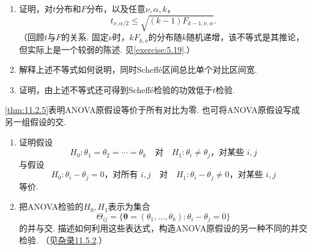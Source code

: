 \begin{exercise}\label{exercise:11.15}\leavevmode
\begin{enumerate}[label=(\alph*)]
\item\label{item:11.15.a} 证明，对$t$分布和$F$分布，以及任意$\nu,\alpha,k$，
$$t_{\nu,\alpha/2}\le\sqrt{(k-1)F_{k-1,\nu,\alpha}}.$$
（回顾$t$与$F$的关系. 固定$\nu$时，$kF_{k,\nu}$的分布随$k$随机递增，该不等式是其推论，但实际上是一个较弱的陈述. 见\autoref{exercise:5.19}.）
\item\label{item:11.15.b} 解释上述不等式如何说明，同时Scheff\'e区间总比单个对比区间宽.
\item\label{item:11.15.c} 证明，由上述不等式还可得到Scheff\'e检验的功效低于$t$检验.
\end{enumerate}
\end{exercise}

\begin{exercise}\label{exercise:11.16}
\autoref{thm:11.2.5}表明ANOVA原假设等价于所有对比为零. 也可将ANOVA原假设写成另一组假设的交.
\begin{enumerate}[label=(\alph*)]
\item\label{item:11.16.a} 证明假设
$$H_0:\theta_1=\theta_2=\cdots=\theta_k\quad\text{对}\quad H_1:\theta_i\ne\theta_j\text{，对某些 }i,j$$
与假设
$$H_0:\theta_i-\theta_j=0\text{，对所有 }i,j\quad\text{对}\quad H_1:\theta_i-\theta_j\ne0\text{，对某些 }i,j$$
等价.
\item\label{item:11.16.b} 把ANOVA检验的$H_0,H_1$表示为集合
$$\Theta_{ij}=\{\boldsymbol\theta=(\theta_1,\ldots,\theta_k):\theta_i-\theta_j=0\}$$
的并与交. 描述如何利用这些表达式，构造ANOVA原假设的另一种不同的并交检验. （见\hyperref[sec:11.5.2]{杂录11.5.2}.）
\end{enumerate}
\end{exercise}

